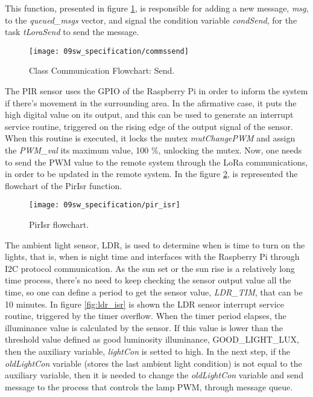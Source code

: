 
This function, presented in figure \ref{fig:flow_send}, is responsible for adding a new message, \textit{msg}, to the \textit{queued\_msgs} vector, and signal the condition variable \textit{condSend}, for the task \textit{tLoraSend} to send the message.

\begin{figure}[H]
	\centering	
	\texttt{[image: 09sw\_specification/commssend]}
	\caption{Class Communication Flowchart: Send.}
	\label{fig:flow_send}
\end{figure}



The PIR sensor uses the GPIO of the Raspberry Pi in order to inform the system if there's movement in the surrounding area. In the afirmative case, it puts the high digital value on its output, and this can be used to generate an interrupt service routine, triggered on the rising edge of the output signal of the sensor. When this routine is executed, it locks the mutex \textit{mutChangePWM} and assign the \textit{PWM\_val} its maximum value, 100 \%, unlocking the mutex. Now, one needs to send the PWM value to the remote system through the LoRa communications, in order to be updated in the remote system. In the figure \ref{fig:pir_isr}, is represented the flowchart of the PirIsr function.

\begin{figure}[H]
	\centering
	\texttt{[image: 09sw\_specification/pir\_isr]}
	\caption{PirIsr flowchart.}
	\label{fig:pir_isr}
\end{figure}

The ambient light sensor, LDR, is used to determine when is time to turn on the lights, that is, when is night time and interfaces with the Raspberry Pi through I2C protocol communication. As the sun set or the sun rise is a relatively long time process, there's no need to keep checking the sensor output value all the time, so one can define a period to get the sensor value, \textit{LDR\_TIM}, that can be 10 minutes. In figure \ref{fig:ldr_isr} is shown the LDR sensor interrupt service routine, triggered by the timer overflow. When the timer period elapses, the illuminance value is calculated by the sensor. If this value is lower than the threshold value defined as good luminosity illuminance, GOOD\_LIGHT\_LUX, then the auxiliary variable, \textit{lightCon} is setted to high. In the next step, if the \textit{oldLightCon} variable (stores the last ambient light condition) is not equal to the auxiliary variable, then it is needed to change the \textit{oldLightCon} variable and send message to the process that controls the lamp PWM, through message queue. 

